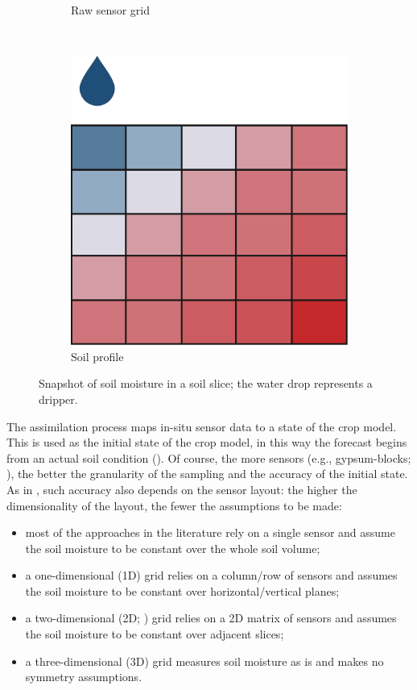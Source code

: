 \begin{figure}[t]
\begin{subfigure}[t]{.3\textwidth}
\caption{Raw sensor grid}
\label{orchard-fig:moisture-sens}
\end{subfigure}
~
\begin{subfigure}[t]{.3\textwidth}
\centering
\includegraphics[scale=.15]{chapters/physics-aware/orchard/img/soil-moisture-profile.pdf}
\caption{Soil profile}
\label{orchard-fig:moisture-profile}
\end{subfigure}
\caption{Snapshot of soil moisture in a soil slice; the water drop represents a dripper.}
\label{orchard-fig:moisture}
\end{figure}

The assimilation process maps in-situ sensor data to a state of the crop model.
This is used as the initial state of the crop model, in this way the forecast begins from an actual soil condition ().
Of course, the more sensors (e.g., gypsum-blocks; ), the better the granularity of the sampling and the accuracy of the initial state.
As in , such accuracy also depends on the sensor layout: the higher the dimensionality of the layout, the fewer the assumptions to be made:
\begin{itemize}
    \item most of the approaches in the literature rely on a single sensor and assume the soil moisture to be constant over the whole soil volume;
    \item a one-dimensional (1D) grid relies on a column/row of sensors and assumes the soil moisture to be constant over horizontal/vertical planes;
    \item a two-dimensional (2D; ) grid relies on a 2D matrix of sensors and assumes the soil moisture to be constant over adjacent slices;
    \item a three-dimensional (3D) grid measures soil moisture as is and makes no symmetry assumptions.
\end{itemize}

